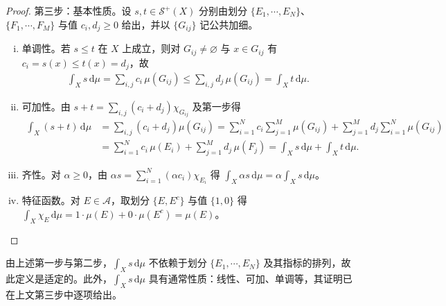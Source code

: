 \documentclass[../../main.tex]{subfiles}%
\begin{document}
\begin{proof}
第三步：基本性质。设 $s,t\in\mathscr S^+(X)$ 分别由划分 $\{E_1,\cdots ,E_N\}$、$\{F_1,\cdots ,F_M\}$ 与值 $c_i,d_j\geqslant0$ 给出，并以 $\{G_{ij}\}$ 记公共加细。
\begin{enumerate}[(i)]
\item 单调性。若 $s\leqslant t$ 在 $X$ 上成立，则对 $G_{ij}\neq\varnothing$ 与 $x\in G_{ij}$ 有 $c_i=s(x)\leqslant t(x)=d_j$，故
\begin{align*}
\int_Xs\,\mathrm{d}\mu=\sum_{i,j}c_i\,\mu(G_{ij})\leqslant\sum_{i,j}d_j\,\mu(G_{ij})=\int_Xt\,\mathrm{d}\mu.
\end{align*}
\item 可加性。由 $s+t=\sum_{i,j}(c_i+d_j)\chi_{G_{ij}}$ 及第一步得
\begin{align*}
\int_X(s+t)\,\mathrm{d}\mu
&=\sum_{i,j}(c_i+d_j)\mu(G_{ij})
=\sum_{i=1}^Nc_i\sum_{j=1}^M\mu(G_{ij})+\sum_{j=1}^Md_j\sum_{i=1}^N\mu(G_{ij})\\
&=\sum_{i=1}^Nc_i\,\mu(E_i)+\sum_{j=1}^Md_j\,\mu(F_j)
=\int_Xs\,\mathrm{d}\mu+\int_Xt\,\mathrm{d}\mu.
\end{align*}
\item 齐性。对 $\alpha\geqslant0$，由 $\alpha s=\sum_{i=1}^N(\alpha c_i)\chi_{E_i}$ 得 $\int_X\alpha s\,\mathrm{d}\mu=\alpha\int_Xs\,\mathrm{d}\mu$。
\item 特征函数。对 $E\in\mathscr A$，取划分 $\{E,E^c\}$ 与值 $\{1,0\}$ 得 $\int_X\chi_E\,\mathrm{d}\mu=1\cdot\mu(E)+0\cdot\mu(E^c)=\mu(E)$。
\end{enumerate}
\end{proof}

由上述第一步与第二步，$\int_Xs\,\mathrm{d}\mu$ 不依赖于划分 $\{E_1,\cdots ,E_N\}$ 及其指标的排列，故此定义是适定的。此外，$\int_Xs\,\mathrm{d}\mu$ 具有通常性质：线性、可加、单调等，其证明已在上文第三步中逐项给出。
\end{document}

